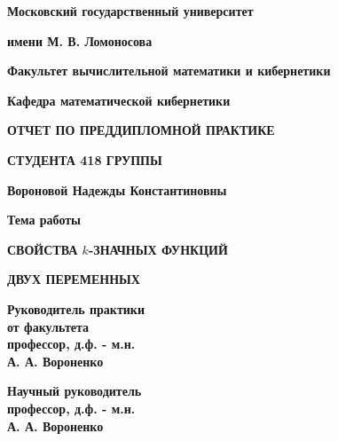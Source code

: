 \documentclass[oneside,final,14pt]{extreport}
\begin{document}

\centerline{ {\bf Московский государственный университет} }
\centerline{{\bf имени М. В. Ломоносова} }

\vspace{\baselineskip}

\centerline{ {\bf Факультет вычислительной математики и кибернетики} }
\centerline{{\bf Кафедра математической кибернетики} }

\vfill
\vfill

\centerline {{\bf ОТЧЕТ ПО ПРЕДДИПЛОМНОЙ ПРАКТИКЕ}}
\centerline {{\bf СТУДЕНТА 418 ГРУППЫ}}

\centerline {{\bf Вороновой Надежды Константиновны}}

\vfill
\vfill

\centerline {{\bf Тема работы}}

\centerline {{\bf СВОЙСТВА \(k\)-ЗНАЧНЫХ ФУНКЦИЙ}}
\centerline {{\bf ДВУХ ПЕРЕМЕННЫХ}}
\normalsize

\vfill
\vfill

\begin{minipage}{0.45\textwidth}
  {\bf Руководитель практики} \\
  {\bf от факультета} \\
  {\bf профессор, д.ф. - м.н.} \\
  {\bf А. А. Вороненко}
\end{minipage}
\hfill
\begin{minipage}{0.4\textwidth}
 {\bf Научный руководитель} \\
 {\bf профессор, д.ф. - м.н.}\\
{\bf А. А. Вороненко }
\end{minipage}
\end{document}
